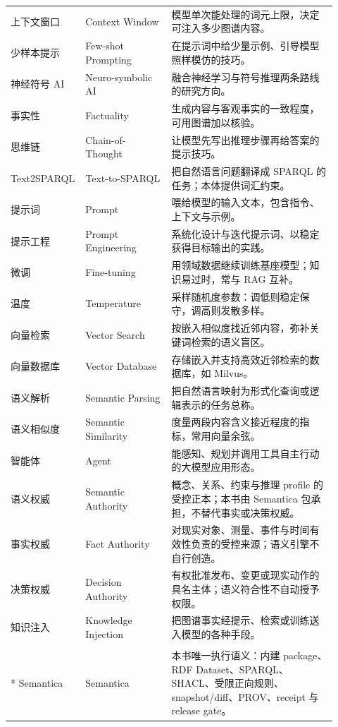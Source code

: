 \begin{longtable}{@{}p{0.16\linewidth}p{0.26\linewidth}p{0.5\linewidth}@{}}
上下文窗口 & Context Window & 模型单次能处理的词元上限，决定可注入多少图谱内容。 \\
少样本提示 & Few-shot Prompting & 在提示词中给少量示例、引导模型照样模仿的技巧。 \\
神经符号 AI & Neuro-symbolic AI & 融合神经学习与符号推理两条路线的研究方向。 \\
事实性 & Factuality & 生成内容与客观事实的一致程度，可用图谱加以核验。 \\
思维链 & Chain-of-Thought & 让模型先写出推理步骤再给答案的提示技巧。 \\
Text2SPARQL & Text-to-SPARQL & 把自然语言问题翻译成 SPARQL 的任务；本体提供词汇约束。 \\
提示词 & Prompt & 喂给模型的输入文本，包含指令、上下文与示例。 \\
提示工程 & Prompt Engineering & 系统化设计与迭代提示词、以稳定获得目标输出的实践。 \\
微调 & Fine-tuning & 用领域数据继续训练基座模型；知识易过时，常与 RAG 互补。 \\
温度 & Temperature & 采样随机度参数：调低则稳定保守，调高则发散多样。 \\
向量检索 & Vector Search & 按嵌入相似度找近邻内容，弥补关键词检索的语义盲区。 \\
向量数据库 & Vector Database & 存储嵌入并支持高效近邻检索的数据库，如 Milvus。 \\
语义解析 & Semantic Parsing & 把自然语言映射为形式化查询或逻辑表示的任务总称。 \\
语义相似度 & Semantic Similarity & 度量两段内容含义接近程度的指标，常用向量余弦。 \\
智能体 & Agent & 能感知、规划并调用工具自主行动的大模型应用形态。 \\
语义权威 & Semantic Authority & 概念、关系、约束与推理 profile 的受控正本；本书由 Semantica 包承担，不替代事实或决策权威。 \\
事实权威 & Fact Authority & 对现实对象、测量、事件与时间有效性负责的受控来源；语义引擎不自行创造。 \\
决策权威 & Decision Authority & 有权批准发布、变更或现实动作的具名主体；语义符合性不自动授予权限。 \\
知识注入 & Knowledge Injection & 把图谱事实经提示、检索或训练送入模型的各种手段。 \\
\addlinespace[10pt]
\multicolumn{3}{@{}l}{\textbf{——工具与生态——}} \\*
\addlinespace[3pt]
Semantica & Semantica & 本书唯一执行语义：内建 package、RDF Dataset、SPARQL、SHACL、受限正向规则、snapshot/diff、PROV、receipt 与 release gate。 \\

\end{longtable}

